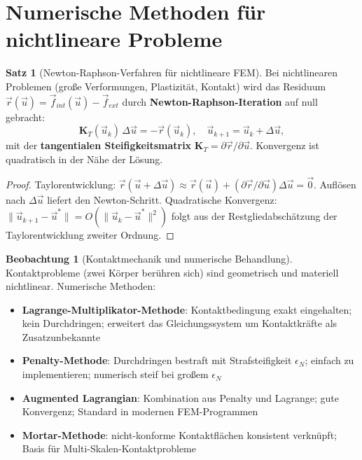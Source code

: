 ﻿\documentclass[a4paper,12pt]{report}
\theoremstyle{definition}
\newtheorem{satz}{Satz}
\newtheorem{beobachtung}{Beobachtung}
\begin{document}
\section{Numerische Methoden für nichtlineare Probleme}

\begin{satz}[Newton-Raphson-Verfahren für nichtlineare FEM]
Bei nichtlinearen Problemen (große Verformungen, Plastizität, Kontakt)
wird das Residuum $\vec{r}(\vec{u}) = \vec{f}_{int}(\vec{u}) - \vec{f}_{ext}$
durch \textbf{Newton-Raphson-Iteration} auf null gebracht:
\[
  \mathbf{K}_T(\vec{u}_k)\,\Delta\vec{u} = -\vec{r}(\vec{u}_k),
  \quad \vec{u}_{k+1} = \vec{u}_k + \Delta\vec{u},
\]
mit der \textbf{tangentialen Steifigkeitsmatrix}
$\mathbf{K}_T = \partial\vec{r}/\partial\vec{u}$.
Konvergenz ist quadratisch in der Nähe der Lösung.
\end{satz}
\begin{proof}
Taylorentwicklung: $\vec{r}(\vec{u}+\Delta\vec{u}) \approx \vec{r}(\vec{u})
+ (\partial\vec{r}/\partial\vec{u})\Delta\vec{u} = \vec{0}$.
Auflösen nach $\Delta\vec{u}$ liefert den Newton-Schritt.
Quadratische Konvergenz: $\|\vec{u}_{k+1}-\vec{u}^*\| = O(\|\vec{u}_k-\vec{u}^*\|^2)$
folgt aus der Restgliedabschätzung der Taylorentwicklung zweiter Ordnung.
\end{proof}

\begin{beobachtung}[Kontaktmechanik und numerische Behandlung]
Kontaktprobleme (zwei Körper berühren sich) sind geometrisch und materiell
nichtlinear. Numerische Methoden:
\begin{itemize}
    \item[-] \textbf{Lagrange-Multiplikator-Methode}: Kontaktbedingung exakt
          eingehalten; kein Durchdringen; erweitert das Gleichungssystem um
          Kontaktkräfte als Zusatzunbekannte
    \item[-] \textbf{Penalty-Methode}: Durchdringen bestraft mit Strafsteifigkeit $\epsilon_N$;
          einfach zu implementieren; numerisch steif bei großem $\epsilon_N$
    \item[-] \textbf{Augmented Lagrangian}: Kombination aus Penalty und
          Lagrange; gute Konvergenz; Standard in modernen FEM-Programmen
    \item[-] \textbf{Mortar-Methode}: nicht-konforme Kontaktflächen konsistent
          verknüpft; Basis für Multi-Skalen-Kontaktprobleme
\end{itemize}
\end{beobachtung}
\end{document}
